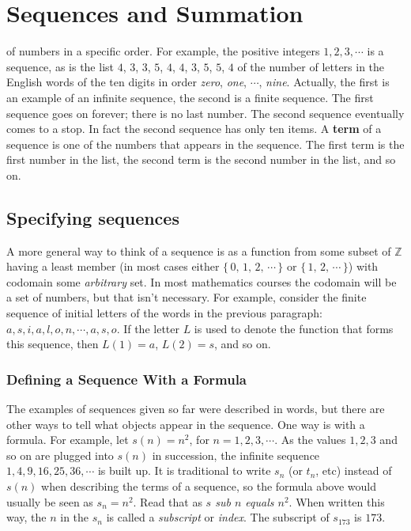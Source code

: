 \chapter{Sequences and Summation}


 of numbers in a specific order. For example, the positive integers 
$1,2,3,\cdots$ is a
sequence, as is the list $4$, $3$, $3$, $5$, $4$, $4$, $3$, $5$, $5$, $4$ of the number of letters
in the English words of the ten digits in order {\itshape zero}, {\itshape one}, $\cdots$,
{\itshape nine}. 
Actually, the first is an example of an infinite sequence, the second is
a finite sequence. The first sequence goes on forever; there is no last number. The
second sequence eventually comes to a stop. In fact the second sequence has only
ten items. A {\bfseries term} of a sequence is one of the numbers that
appears in the sequence. The first term is the first number in the list,
the second term is the second number in the list, and so on.

\section{Specifying sequences}
  A more general way to think of a sequence is as a function from some subset
of $\mathbb{Z}$ having a least member (in most cases
either
 $\{\,0,\,1,\,2,\,\cdots\,\}$ or
$\{\,1,\,2,\,\cdots\,\}$) with codomain some {\itshape arbitrary} set. %
%
 In most mathematics
courses the codomain will be a set of numbers, but that isn't necessary. For
example, consider the finite sequence of initial letters of the words in the
previous paragraph: $a,s,i,a,l,o,n,\cdots,a,s,o$. If the letter $L$ is used to
denote the function that forms this sequence, then $L(1) = a$, $L(2) = s$, and so on.

\subsection{Defining a Sequence With a Formula}
  The examples of sequences given so far were described in words,
but there are other ways to tell what objects appear in the sequence.
One way is with a formula. For example, let $s(n)=n^2$, for
$n=1,2,3,\cdots$. As the values $1,2,3$ and so on are plugged into
$s(n)$ in succession, the infinite sequence $1,4,9,16,25,36,\cdots$ is
built up. It is traditional to write $s_n$ (or $t_n$, etc)
instead of $s(n)$ when describing the terms of a sequence, so the
formula above would usually be seen as $s_n=n^2$. Read that as
{\itshape $s$ sub $n$ equals $n^2$}. When written this
way, the $n$ in the $s_n$ is called a {\itshape subscript} or {\itshape index}. 
The subscript of $s_{173}$ is $173$.


